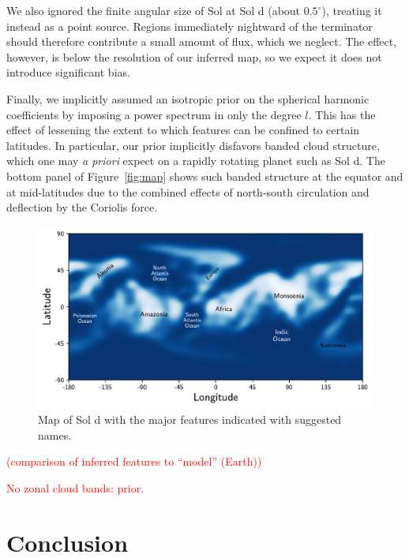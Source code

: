 \documentclass[modern]{aastex62}
\newcommand{\todo}[1]{\textcolor{red}{#1}}
\begin{document}
We also ignored the finite angular size of Sol at Sol d (about $0.5^\circ$),
treating it instead as a point source. Regions immediately nightward of the 
terminator should therefore contribute a small amount of flux, which we neglect.
The effect, however, is below the resolution of our inferred map, so we expect
it does not introduce significant bias.

Finally, we implicitly assumed an isotropic prior on the spherical harmonic
coefficients by imposing a power spectrum in only the degree $l$. This has the
effect of lessening the extent to which features can be confined to certain
latitudes. In particular, our prior implicitly disfavors banded cloud structure,
which one may \emph{a priori} expect on a rapidly rotating planet such as 
Sol d. The bottom panel of Figure~\ref{fig:map} shows such banded structure
at the equator and at mid-latitudes due to the combined effects of 
north-south circulation and deflection by the Coriolis force.




\begin{figure}[t!]
    \begin{centering}
    \includegraphics[width=\linewidth]{figures/map_labels.pdf}
    \caption{\label{fig:map_labels}
             Map of Sol d with the major features indicated with suggested
             names.
             }
    \end{centering}
\end{figure}

\todo{(comparison of inferred features to ``model'' (Earth))}

\todo{No zonal cloud bands: prior.}

\section{Conclusion}
\label{sec:conclusion}
\end{document}

